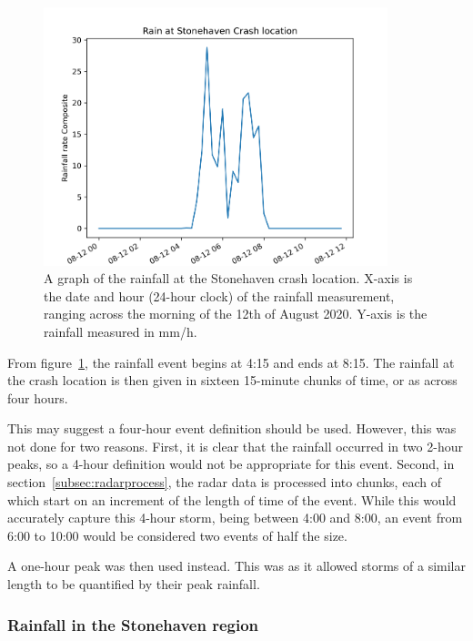 \documentclass[12pt,a4paper]{report}
\begin{document}
\begin{figure}[H]
    \begin{center}
    \includegraphics[width=100mm]{stonehavendayraingraph}
    \end{center}
    \caption{A graph of the rainfall at the Stonehaven crash location.
    X-axis is the date and hour (24-hour clock) of the rainfall measurement,
        ranging across the morning of the 12th of August 2020.
    Y-axis is the rainfall measured in mm/h.}
    \label{fig:stonehavendayraingraph}
\end{figure}

From figure~\ref{fig:stonehavendayraingraph},
    the rainfall event begins at 4:15 and ends at 8:15.
The rainfall at the crash location is then given in sixteen 15-minute chunks of time,
    or as across four hours.

This may suggest a four-hour event definition should be used.
However, this was not done for two reasons.
First, it is clear that the rainfall occurred in two 2-hour peaks,
 so a 4-hour definition would not be appropriate for this event.
Second, in section~\ref{subsec:radarprocess},
    the radar data is processed into chunks,
    each of which start on an increment of the length of time of the event.
While this would accurately capture this 4-hour storm, being between 4:00 and 8:00,
    an event from 6:00 to 10:00 would be considered two events of half the size.

A one-hour peak was then used instead.
This was as it allowed storms of a similar length to be quantified by their peak rainfall.

\subsubsection{Rainfall in the Stonehaven region}
\end{document}
